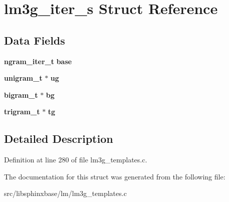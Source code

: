 \section{lm3g\-\_\-iter\-\_\-s Struct Reference}
\label{structlm3g__iter__s}
\subsection*{Data Fields}
\begin{DoxyCompactItemize}
\item 
{\bf ngram\-\_\-iter\-\_\-t} {\bfseries base}\label{structlm3g__iter__s_ae24753ad344180c9b3a6162444ecbc3c}

\item 
{\bf unigram\-\_\-t} $\ast$ {\bfseries ug}\label{structlm3g__iter__s_a8a4ce73a4ae6d75de2682c84ae345b1b}

\item 
{\bf bigram\-\_\-t} $\ast$ {\bfseries bg}\label{structlm3g__iter__s_a484e0af0540b59dced50e8f39a7bf691}

\item 
{\bf trigram\-\_\-t} $\ast$ {\bfseries tg}\label{structlm3g__iter__s_af8d3b111d9a5f98c1e2830866c72658a}

\end{DoxyCompactItemize}


\subsection{Detailed Description}


Definition at line 280 of file lm3g\-\_\-templates.\-c.



The documentation for this struct was generated from the following file\-:\begin{DoxyCompactItemize}
\item 
src/libsphinxbase/lm/lm3g\-\_\-templates.\-c\end{DoxyCompactItemize}
